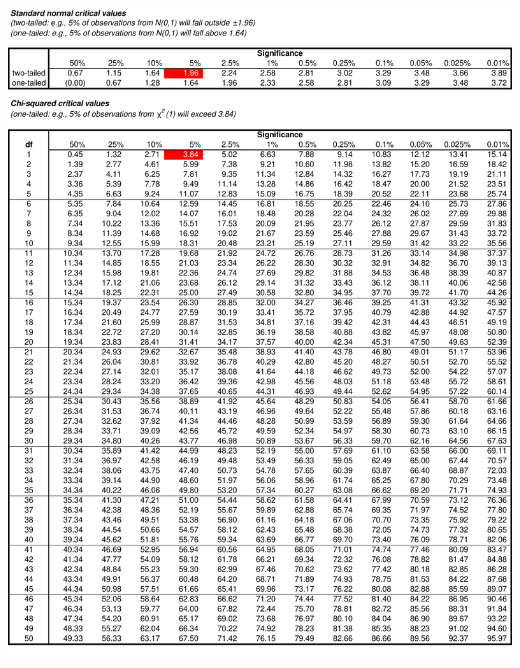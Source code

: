 \documentclass[8pt,letterpaper, landscape]{extarticle} %
\begin{document}
\printindex
\begin{center}
\includegraphics[height=9.75in, angle=90]{images/cv1}

\end{center}
\end{document}
